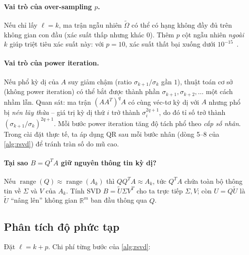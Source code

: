 \paragraph{Vai trò của over-sampling $p$.}
Nếu chỉ lấy $\ell = k$, ma trận ngẫu nhiên $\widetilde{\Omega}$ có thể có hạng
không đầy đủ trên không gian con đầu (xác suất thấp nhưng khác $0$). Thêm
$p$ cột ngẫu nhiên \emph{ngoài} $k$ giúp triệt tiêu xác suất này: với $p = 10$,
xác suất thất bại xuống dưới $10^{-15}$~\cite{halko2011}.

\paragraph{Vai trò của power iteration.}
Nếu phổ kỳ dị của $A$ suy giảm chậm
(ratio $\sigma_{k+1}/\sigma_k$ gần $1$), thuật toán cơ sở (không power
iteration) có thể bắt được thành phần $\sigma_{k+1}, \sigma_{k+2}, \dots$ một
cách nhầm lẫn. Quan sát: ma trận $(A A^T)^q A$ có cùng véc-tơ kỳ dị với $A$
nhưng phổ bị \emph{nén lũy thừa} -- giá trị kỳ dị thứ $i$ trở thành
$\sigma_i^{2q+1}$, do đó tỉ số trở thành $(\sigma_{k+1}/\sigma_k)^{2q+1}$. Mỗi
bước power iteration tăng độ tách phổ theo \emph{cấp số nhân}. Trong cài đặt
thực tế, ta áp dụng QR sau mỗi bước nhân (dòng 5--8 của \cref{alg:rsvd}) để
tránh tràn số do mũ cao.

\paragraph{Tại sao $B = Q^T A$ giữ nguyên thông tin kỳ dị?}
Nếu $\operatorname{range}(Q) \approx \operatorname{range}(A_k)$ thì
$Q Q^T A \approx A_k$, tức $Q^T A$ chứa toàn bộ thông tin về $\Sigma$ và $V$
của $A_k$. Tính SVD $B = \widetilde{U} \Sigma V^T$ cho ta trực tiếp $\Sigma, V$;
còn $U = Q\widetilde{U}$ là $\widetilde{U}$ ``nâng lên'' không gian
$\mathbb{R}^m$ ban đầu thông qua $Q$.

\subsection{Phân tích độ phức tạp}\label{subsec:complexity}

Đặt $\ell = k + p$. Chi phí từng bước của \cref{alg:rsvd}:

